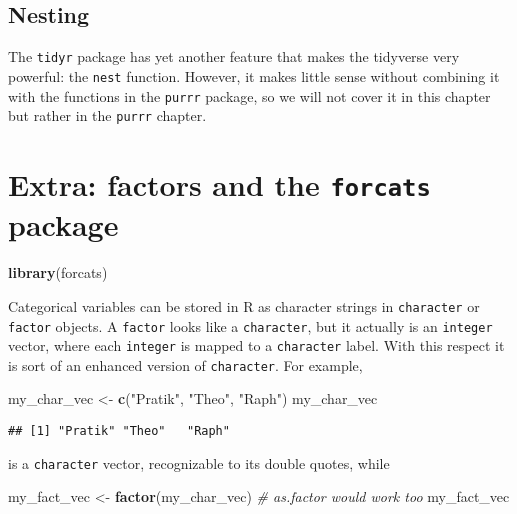\documentclass[
]{book}
\newenvironment{Shaded}{}{}
\newcommand{\CommentTok}[1]{\textcolor[rgb]{0.38,0.63,0.69}{\textit{#1}}}
\newcommand{\KeywordTok}[1]{\textcolor[rgb]{0.00,0.44,0.13}{\textbf{#1}}}
\newcommand{\NormalTok}[1]{#1}
\newcommand{\StringTok}[1]{\textcolor[rgb]{0.25,0.44,0.63}{#1}}
\begin{document}
\hypertarget{nesting}{%
\subsection{Nesting}\label{nesting}}

The \texttt{tidyr} package has yet another feature that makes the tidyverse very powerful: the \texttt{nest} function. However, it makes little sense without combining it with the functions in the \texttt{purrr} package, so we will not cover it in this chapter but rather in the \texttt{purrr} chapter.

\hypertarget{extra-factors-and-the-forcats-package}{%
\section{\texorpdfstring{Extra: factors and the \texttt{forcats} package}{Extra: factors and the forcats package}}\label{extra-factors-and-the-forcats-package}}

\begin{Shaded}
\begin{Highlighting}[]
\KeywordTok{library}\NormalTok{(forcats)}
\end{Highlighting}
\end{Shaded}

Categorical variables can be stored in R as character strings in \texttt{character} or \texttt{factor} objects. A \texttt{factor} looks like a \texttt{character}, but it actually is an \texttt{integer} vector, where each \texttt{integer} is mapped to a \texttt{character} label. With this respect it is sort of an enhanced version of \texttt{character}. For example,

\begin{Shaded}
\begin{Highlighting}[]
\NormalTok{my_char_vec <-}\StringTok{ }\KeywordTok{c}\NormalTok{(}\StringTok{"Pratik"}\NormalTok{, }\StringTok{"Theo"}\NormalTok{, }\StringTok{"Raph"}\NormalTok{)}
\NormalTok{my_char_vec}
\end{Highlighting}
\end{Shaded}

\begin{verbatim}
## [1] "Pratik" "Theo"   "Raph"
\end{verbatim}

is a \texttt{character} vector, recognizable to its double quotes, while

\begin{Shaded}
\begin{Highlighting}[]
\NormalTok{my_fact_vec <-}\StringTok{ }\KeywordTok{factor}\NormalTok{(my_char_vec) }\CommentTok{# as.factor would work too}
\NormalTok{my_fact_vec}
\end{Highlighting}
\end{Shaded}
\end{document}
